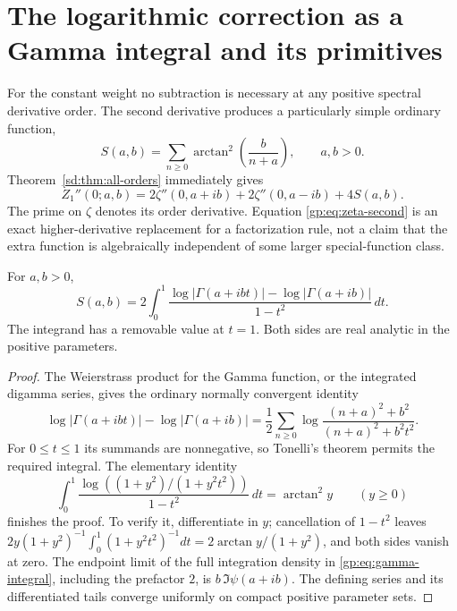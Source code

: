 \section{The logarithmic correction as a Gamma integral and its primitives}
\label{gp:section}

For the constant weight no subtraction is necessary at any positive
spectral derivative order.  The second derivative produces a particularly
simple ordinary function,
\begin{equation}\label{gp:eq:S}
 S(a,b)=\sum_{n\ge0}\arctan^2\!\left(\frac{b}{n+a}\right),
 \qquad a,b>0.
\end{equation}
Theorem~\ref{sd:thm:all-orders} immediately gives
\begin{equation}\label{gp:eq:zeta-second}
 Z_1''(0;a,b)=2\zeta''(0,a+ib)+2\zeta''(0,a-ib)+4S(a,b).
\end{equation}
The prime on $\zeta$ denotes its order derivative.  Equation
\eqref{gp:eq:zeta-second} is an exact higher-derivative replacement
for a factorization rule, not a claim that the extra function is
algebraically independent of some larger special-function class.

\begin{theorem}
\label{gp:thm:gamma-integral}
For $a,b>0$,
\begin{equation}\label{gp:eq:gamma-integral}
 \boxed{\displaystyle
 S(a,b)=2\int_0^1
  \frac{\log|\Gamma(a+ibt)|-\log|\Gamma(a+ib)|}{1-t^2}\,dt.}
\end{equation}
The integrand has a removable value at $t=1$.  Both sides are real
analytic in the positive parameters.
\end{theorem}
\begin{proof}
The Weierstrass product for the Gamma function, or the integrated
digamma series, gives the ordinary normally convergent identity
\[
 \log|\Gamma(a+ibt)|-\log|\Gamma(a+ib)|
 =\frac12\sum_{n\ge0}
          \log\frac{(n+a)^2+b^2}{(n+a)^2+b^2t^2}.
\]
For $0\le t\le1$ its summands are nonnegative, so Tonelli's theorem
permits the required integral.  The elementary identity
\begin{equation}\label{gp:eq:elementary-kernel}
 \int_0^1\frac{\log((1+y^2)/(1+y^2t^2))}{1-t^2}\,dt
 =\arctan^2y\qquad(y\ge0)
\end{equation}
finishes the proof.  To verify it, differentiate in $y$; cancellation
of $1-t^2$ leaves
$2y(1+y^2)^{-1}\int_0^1(1+y^2t^2)^{-1}dt
=2\arctan y/(1+y^2)$, and both sides vanish at zero.
The endpoint limit of the full integration density in
\eqref{gp:eq:gamma-integral}, including the prefactor $2$, is
$b\,\Im\psi(a+ib)$.  The defining series and its differentiated
tails converge uniformly on compact positive parameter sets.
\end{proof}

